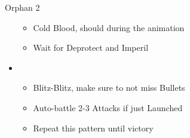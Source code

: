 \begin{battle}[1:05]{Orphan 2}
\begin{multicols}{2}
\begin{itemize}
			\begin{itemize}
				\item Cold Blood, should \stagger during the animation
				\item Wait for Deprotect and Imperil
			\end{itemize}
			\item \first
			      \begin{itemize}
				      \item Blitz-Blitz, make sure to not miss Bullets
				      \item Auto-battle 2-3 Attacks if just Launched
				      \item Repeat this pattern until victory
			      \end{itemize}
		\end{itemize}
	\end{multicols}
\end{battle}
